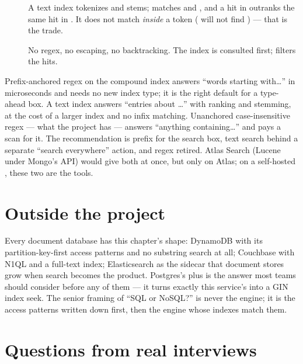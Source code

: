 \begin{description}
  \item[] A text index tokenizes and stems;  matches
   and , and a hit in  outranks
  the same hit in . It does not match \emph{inside} a
  token ( will not find ) --- that is the trade.
  \item[] No regex, no escaping, no backtracking. The index is
  consulted first;  filters the hits.
\end{description}

\begin{decision}
Prefix-anchored regex on the compound index answers ``words starting
with\ldots'' in microseconds and needs no new index type; it is the
right default for a type-ahead box. A text index answers ``entries about
\ldots'' with ranking and stemming, at the cost of a larger index and
no infix matching. Unanchored case-insensitive regex --- what the
project has --- answers ``anything containing\ldots'' and pays a scan
for it. The recommendation is prefix for the search box, text search
behind a separate ``search everywhere'' action, and regex retired.
Atlas Search (Lucene under Mongo's API) would give both at once, but
only on Atlas; on a self-hosted , these two are the tools.
\end{decision}

\section{Outside the project}

Every document database has this chapter's shape: DynamoDB with its
partition-key-first access patterns and no substring search at all;
Couchbase with N1QL and a full-text index; Elasticsearch as the sidecar
that document stores grow when search becomes the product. Postgres's
 plus  is the answer most teams should
consider before any of them --- it turns exactly this service's
 into a GIN index seek. The senior framing of
``SQL or NoSQL?'' is never the engine; it is the access patterns
written down first, then the engine whose indexes match them.

\section{Questions from real interviews}

